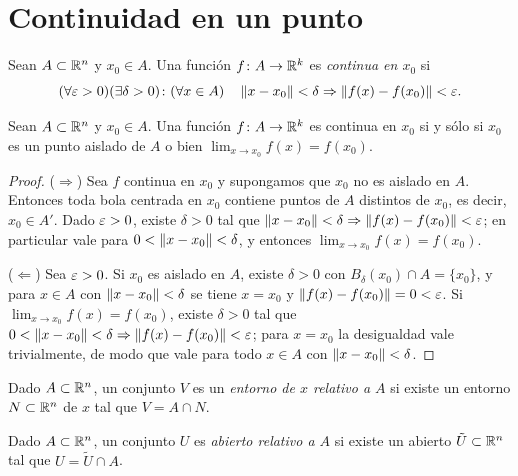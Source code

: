 \section{Continuidad en un punto}

\begin{definition}
  Sean \(A \subset \mathbb{R}^n\) y \(x_0 \in A\). Una función \(f\colon A \to \mathbb{R}^k\) es \emph{continua en \(x_0\)} si
  \[
    (\forall \varepsilon > 0)(\exists \delta > 0) \colon (\forall x \in A) \quad \left\lVert x - x_0 \right\rVert < \delta \Rightarrow \left\lVert f(x) - f(x_0) \right\rVert < \varepsilon.
  \]
\end{definition}

\begin{lemma}
  Sean \(A \subset \mathbb{R}^n\) y \(x_0 \in A\). Una función \(f\colon A \to \mathbb{R}^k\) es continua en \(x_0\) si y sólo si \(x_0\) es un punto aislado de \(A\) o bien \(\lim_{x \to x_0} f(x) = f(x_0)\).
\end{lemma}

\begin{proof}
  (\(\Rightarrow\)) Sea \(f\) continua en \(x_0\) y supongamos que \(x_0\) no es aislado en \(A\). Entonces toda bola centrada en \(x_0\) contiene puntos de \(A\) distintos de \(x_0\), es decir, \(x_0 \in A'\). Dado \(\varepsilon > 0\), existe \(\delta > 0\) tal que \(\left\lVert x - x_0 \right\rVert < \delta \Rightarrow \left\lVert f(x) - f(x_0) \right\rVert < \varepsilon\); en particular vale para \(0 < \left\lVert x - x_0 \right\rVert < \delta\), y entonces \(\lim_{x \to x_0} f(x) = f(x_0)\).

  (\(\Leftarrow\)) Sea \(\varepsilon > 0\). Si \(x_0\) es aislado en \(A\), existe \(\delta > 0\) con \(B_{\delta}(x_0) \cap A = \{x_0\}\), y para \(x \in A\) con \(\left\lVert x - x_0 \right\rVert < \delta\) se tiene \(x = x_0\) y \(\left\lVert f(x) - f(x_0) \right\rVert = 0 < \varepsilon\). Si \(\lim_{x \to x_0} f(x) = f(x_0)\), existe \(\delta > 0\) tal que \(0 < \left\lVert x - x_0 \right\rVert < \delta \Rightarrow \left\lVert f(x) - f(x_0) \right\rVert < \varepsilon\); para \(x = x_0\) la desigualdad vale trivialmente, de modo que vale para todo \(x \in A\) con \(\left\lVert x - x_0 \right\rVert < \delta\).
\end{proof}

\begin{definition}
  Dado \(A \subset \mathbb{R}^n\), un conjunto \(V\) es un \emph{entorno de \(x\) relativo a \(A\)} si existe un entorno \(N \subset \mathbb{R}^n\) de \(x\) tal que \(V = A \cap N\).
\end{definition}

\begin{definition}
  Dado \(A \subset \mathbb{R}^n\), un conjunto \(U\) es \emph{abierto relativo a \(A\)} si existe un abierto \(\tilde{U} \subset \mathbb{R}^n\) tal que \(U = \tilde{U} \cap A\).
\end{definition}

